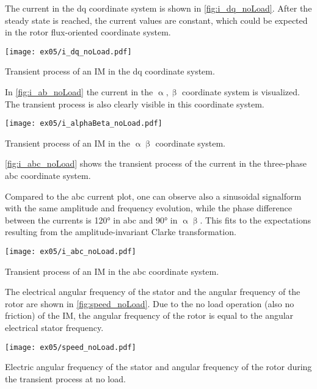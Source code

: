 \begin{solutionblock}
    The current in the dq coordinate system is shown in \autoref{fig:i_dq_noLoad}. After the steady state is reached, the current values are constant, which could be expected in the rotor flux-oriented coordinate system.
    \begin{solutionfigure}[ht]
        \centering
        \texttt{[image: ex05/i\_dq\_noLoad.pdf]}
        \caption{Transient process of an IM in the dq coordinate system.}
        \label{fig:i_dq_noLoad}
    \end{solutionfigure}

    In \autoref{fig:i_ab_noLoad} the current in the $\upalpha, \upbeta$ coordinate system is visualized. The transient process is also clearly visible in this coordinate system.
    \begin{solutionfigure}[ht]
        \centering
        \texttt{[image: ex05/i\_alphaBeta\_noLoad.pdf]}
        \caption{Transient process of an IM in the $\upalpha \upbeta$ coordinate system.}
        \label{fig:i_ab_noLoad}
    \end{solutionfigure}

    \autoref{fig:i_abc_noLoad} shows the transient process of the current in the three-phase abc coordinate system.
    
    Compared to the abc current plot, one can observe also a sinusoidal signalform with the same amplitude and frequency evolution, while the phase difference between the currents is 120° in abc and 90° in $\upalpha\upbeta$. This fits to the expectations resulting from the amplitude-invariant Clarke transformation.
    \begin{solutionfigure}[ht]
        \centering
        \texttt{[image: ex05/i\_abc\_noLoad.pdf]}
        \caption{Transient process of an IM in the abc coordinate system.}
        \label{fig:i_abc_noLoad}
    \end{solutionfigure}

    The electrical angular frequency of the stator and the angular frequency of the rotor are shown in \autoref{fig:speed_noLoad}. Due to the no load operation (also no friction) of the IM, the angular frequency of the rotor is equal to the angular electrical stator frequency.
    \begin{solutionfigure}[ht]
        \centering
        \texttt{[image: ex05/speed\_noLoad.pdf]}
        \caption{Electric angular frequency of the stator and angular frequency of the rotor during the transient process at no load.}
        \label{fig:speed_noLoad}
    \end{solutionfigure}


\end{solutionblock}
